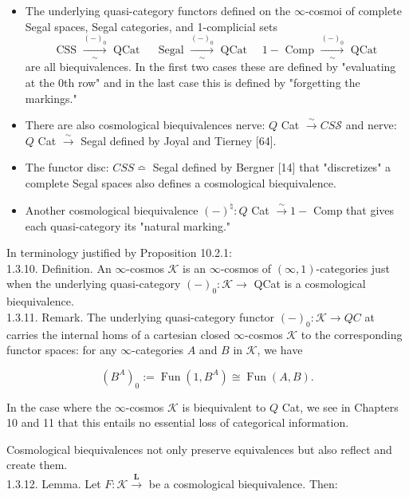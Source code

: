 \documentclass[10pt]{article}
\begin{document}
\begin{itemize}
  \item[(i)] The underlying quasi-category functors defined on the $\infty$-cosmoi of complete Segal spaces, Segal categories, and 1-complicial sets
$$
\text { CSS } \xrightarrow[\sim]{(-)_{0}} \text { QCat } \quad \text { Segal } \xrightarrow[\sim]{(-)_{0}} \text { QCat } \quad 1-\text { Comp } \xrightarrow[\sim]{(-)_{0}} \text { QCat }
$$
are all biequivalences. In the first two cases these are defined by "evaluating at the 0th row" and in the last case this is defined by "forgetting the markings."
  \item[(ii)] There are also cosmological biequivalences nerve: $Q$ Cat $\xrightarrow{\sim} C S \mathcal{S}$ and nerve: $Q$ Cat $\xrightarrow{\sim}$ Segal defined by Joyal and Tierney [64].
  \item[(iii)] The functor disc: $C S S \bumpeq$ Segal defined by Bergner [14] that "discretizes" a complete Segal spaces also defines a cosmological biequivalence.
  \item[(iv)] Another cosmological biequivalence $(-)^{\natural}: Q$ Cat $\xrightarrow{\sim} 1-$ Comp that gives each quasi-category its "natural marking."
\end{itemize}

In terminology justified by Proposition 10.2.1:\\
1.3.10. Definition. An $\infty$-cosmos $\mathcal{K}$ is an $\infty$-cosmos of $(\infty, 1)$-categories just when the underlying quasi-category $(-)_{0}: \mathcal{K} \rightarrow$ QCat is a cosmological biequivalence.\\
1.3.11. Remark. The underlying quasi-category functor $(-)_{0}: \mathcal{K} \rightarrow Q C$ at carries the internal homs of a cartesian closed $\infty$-cosmos $\mathcal{K}$ to the corresponding functor spaces: for any $\infty$-categories $A$ and $B$ in $\mathcal{K}$, we have

$$
\left(B^{A}\right)_{0}:=\operatorname{Fun}\left(1, B^{A}\right) \cong \operatorname{Fun}(A, B) .
$$

In the case where the $\infty$-cosmos $\mathcal{K}$ is biequivalent to $Q$ Cat, we see in Chapters 10 and 11 that this entails no essential loss of categorical information.

Cosmological biequivalences not only preserve equivalences but also reflect and create them.\\
1.3.12. Lemma. Let $F: \mathcal{K} \xrightarrow{\boldsymbol{L}}$ be a cosmological biequivalence. Then:
\end{document}
